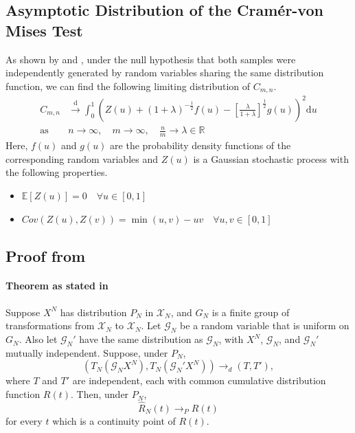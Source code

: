 \documentclass[12pt, a4paper]{article}
\theoremstyle{MAstyle} \newtheorem{assumption}{Assumption}[section]
\theoremstyle{MAstyle} \newtheorem{definition}{Definition}[section]
\theoremstyle{MAstyle} \newtheorem{theorem}{Theorem}[section]
\begin{document}
		\subsection{Asymptotic Distribution of the Cram\'{e}r-von Mises Test}\label{asymp_CvM}
			As shown by \cite{rosenblatt_limit_1952} and \cite{fisz_result_1960}, under the null hypothesis that both samples were independently generated by random variables sharing the same distribution function, we can find the following limiting distribution of $C_{m,n}$.
			\begin{equation}
				\begin{split}
					C_{m,n} &\xrightarrow{\text{d}} \int_{0}^{1} \left(Z(u) + \left(1 + \lambda\right)^{-\frac{1}{2}} f(u) - \left[\frac{\lambda}{1+\lambda}\right]^{\frac{1}{2}}g(u)\right)^2 \mathrm{d}u \\
					\text{as} \quad &n \rightarrow \infty, \quad m \rightarrow \infty, \quad \frac{n}{m} \rightarrow \lambda \in \mathbb{R}
				\end{split}
			\end{equation}
			Here, $f(u)$ and $g(u)$ are the probability density functions of the corresponding random variables and $Z(u)$ is a Gaussian stochastic process with the following properties.
			\begin{itemize}
				\item $\mathbb{E}\left[Z(u)\right] = 0 \quad \forall u \in [0,1]$
				\item $Cov\left(Z(u), Z(v)\right) = \min(u,v) - uv \quad \forall u,v \in [0,1]$
			\end{itemize}
		
		\subsection{Proof from \cite{hoeffding_large-sample_1952}}\label{hoeffding}
			\paragraph{Theorem as stated in \cite{lehmann_testing_2005} \\}
			Suppose $X^N$ has distribution $P_N$ in $\mathcal{X}_N$, and $G_N$ is a finite group of transformations from $\mathcal{X}_N$ to $\mathcal{X}_N$. Let $\mathcal{G}_N$ be a random variable that is uniform on $G_N$. Also let $\mathcal{G}_N'$ have the same distribution as $\mathcal{G}_N$, with $X^N$, $\mathcal{G}_N$, and $\mathcal{G}_N'$ mutually independent. Suppose, under $P_N$,
			\begin{equation}\label{convergence_hypo}
				\left(T_N(\mathcal{G}_N X^N), T_N(\mathcal{G}_N' X^N)\right) \rightarrow_d (T, T'),
			\end{equation}
			where $T$ and $T'$ are independent, each with common cumulative distribution function $R(t)$. Then, under $P_N$,
			\begin{equation}
				\hat{R}_N(t) \rightarrow_P R(t)
			\end{equation}
			for every $t$ which is a continuity point of $R(t)$.
		
\end{document}
